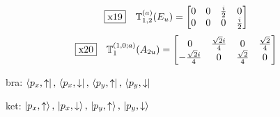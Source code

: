 \documentclass[fleqn,10pt,landscape]{jsarticle}
\begin{document}
\begin{dmath*}
\fbox{x19}\quad \mathbb{T}_{1,2}^{(a)}(E_{u})=\begin{bmatrix} 0 & 0 & \frac{i}{2} & 0 \\ 0 & 0 & 0 & \frac{i}{2} \end{bmatrix}
\end{dmath*}
\begin{dmath*}
\fbox{x20}\quad \mathbb{T}_{1}^{(1,0;a)}(A_{2u})=\begin{bmatrix} 0 & \frac{\sqrt{2} i}{4} & 0 & \frac{\sqrt{2}}{4} \\ - \frac{\sqrt{2} i}{4} & 0 & \frac{\sqrt{2}}{4} & 0 \end{bmatrix}
\end{dmath*}
\vspace{5mm}

\noindent\textbullet\, bra: $\bra{p_{x},\uparrow},\, \bra{p_{x},\downarrow},\, \bra{p_{y},\uparrow},\, \bra{p_{y},\downarrow}$

\noindent\textbullet\, ket: $\ket{p_{x},\uparrow},\, \ket{p_{x},\downarrow},\, \ket{p_{y},\uparrow},\, \ket{p_{y},\downarrow}$
\end{document}

